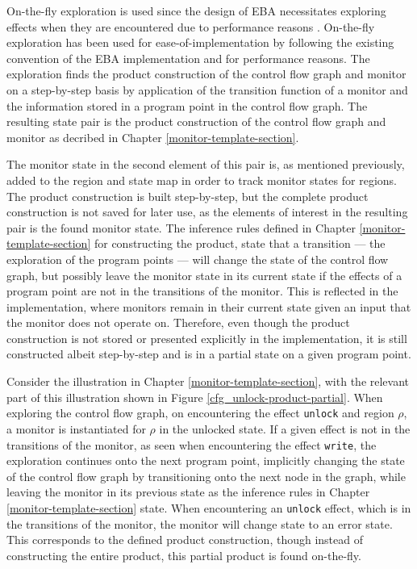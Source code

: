 \newpar On-the-fly exploration is used since the design of EBA necessitates exploring effects when they are encountered due to performance reasons \cite{Abal2017EffectiveBF}. On-the-fly exploration has been used for ease-of-implementation by following the existing convention of the EBA implementation and for performance reasons. The exploration finds the product construction of the control flow graph and monitor on a step-by-step basis by application of the transition function of a monitor and the information stored in a program point in the control flow graph. The resulting state pair is the product construction of the control flow graph and monitor as decribed in Chapter \ref{monitor-template-section}. 

\newpar The monitor state in the second element of this pair is, as mentioned previously, added to the region and state map in order to track monitor states for regions. The product construction is built step-by-step, but the complete product construction is not saved for later use, as the elements of interest in the resulting pair is the found monitor state. The inference rules defined in Chapter \ref{monitor-template-section} for constructing the product, state that a transition --- the exploration of the program points --- will change the state of the control flow graph, but possibly leave the monitor state in its current state if the effects of a program point are not in the transitions of the monitor. This is reflected in the implementation, where monitors remain in their current state given an input that the monitor does not operate on. Therefore, even though the product construction is not stored or presented explicitly in the implementation, it is still constructed albeit step-by-step and is in a partial state on a given program point.

\newpar Consider the illustration in Chapter \ref{monitor-template-section}, with the relevant part of this illustration shown in Figure \ref{cfg_unlock-product-partial}. When exploring the control flow graph, on encountering the effect \texttt{unlock} and region $\rho$, a monitor is instantiated for $\rho$ in the unlocked state. If a given effect is not in the transitions of the monitor, as seen when encountering the effect \texttt{write}, the exploration continues onto the next program point, implicitly changing the state of the control flow graph by transitioning onto the next node in the graph, while leaving the monitor in its previous state as the inference rules in Chapter \ref{monitor-template-section} state. When encountering an \texttt{unlock} effect, which is in the transitions of the monitor, the monitor will change state to an error state. This corresponds to the defined product construction, though instead of constructing the entire product, this partial product is found on-the-fly. 


